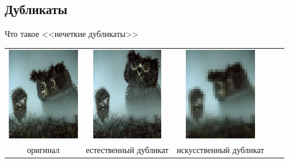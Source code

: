 
\subsection{Дубликаты}


%

\begin{frame}{Что такое <<нечеткие дубликаты>>}
    \begin{tabular}{ccccc}
        \includegraphics[height=4cm]{img/video/near-dublicate-1-1.png}
        &
        \includegraphics[height=4cm]{img/video/near-dublicate-1-2.png}
        &
        \includegraphics[height=4cm]{img/video/near-dublicate-1-3.png}
        \\
        {\small оригинал}
        &
        {\footnotesize естественный дубликат}
        &
        {\footnotesize искусственный дубликат}
        \\
    \end{tabular}
\end{frame}
